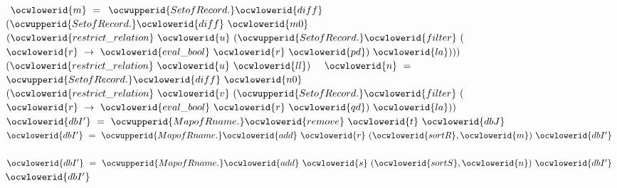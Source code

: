 \documentclass[12pt]{article}
\begin{document}
\ocwindent{1.00em}
~$\ocwlowerid{m}~=~$\ocweol
\ocwindent{1.00em}
$\ocwupperid{SetofRecord.}\ocwlowerid{diff}$\ocweol
\ocwindent{1.50em}
$(\ocwupperid{SetofRecord.}\ocwlowerid{diff}~\ocwlowerid{m0}~$\ocweol
\ocwindent{2.00em}
$(\ocwlowerid{restrict\_relation}~\ocwlowerid{u}~(\ocwupperid{SetofRecord.}\ocwlowerid{filter}~($~$\ocwlowerid{r}~\rightarrow{}~\ocwlowerid{eval\_bool}~\ocwlowerid{r}~\ocwlowerid{pd})~\ocwlowerid{la})))$\ocweol
\ocwindent{2.00em}
$(\ocwlowerid{restrict\_relation}~\ocwlowerid{u}~\ocwlowerid{ll})~$\ocweol
\ocwindent{1.00em}
~$\ocwlowerid{n}~=~$\ocweol
\ocwindent{1.50em}
$\ocwupperid{SetofRecord.}\ocwlowerid{diff}~\ocwlowerid{n0}~$\ocweol
\ocwindent{2.00em}
$(\ocwlowerid{restrict\_relation}~\ocwlowerid{v}~(\ocwupperid{SetofRecord.}\ocwlowerid{filter}~($~$\ocwlowerid{r}~\rightarrow{}~\ocwlowerid{eval\_bool}~\ocwlowerid{r}~\ocwlowerid{qd})~\ocwlowerid{la}))~$\ocweol
\ocwindent{1.00em}
~$\ocwlowerid{dbI'}~=~\ocwupperid{MapofRname.}\ocwlowerid{remove}~\ocwlowerid{t}~\ocwlowerid{dbJ}~$\ocweol
\ocwindent{1.00em}
~$\ocwlowerid{dbI'}~=~\ocwupperid{MapofRname.}\ocwlowerid{add}~\ocwlowerid{r}~(\ocwlowerid{sortR},\ocwlowerid{m})~\ocwlowerid{dbI'}~$\ocweol
\ocwindent{1.00em}
~$\ocwlowerid{dbI'}~=~\ocwupperid{MapofRname.}\ocwlowerid{add}~\ocwlowerid{s}~(\ocwlowerid{sortS},\ocwlowerid{n})~\ocwlowerid{dbI'}~$\ocweol
\ocwindent{1.00em}
$\ocwlowerid{dbI'}$\ocweol
\ocweol
\ocwendcode{}
\end{document}
